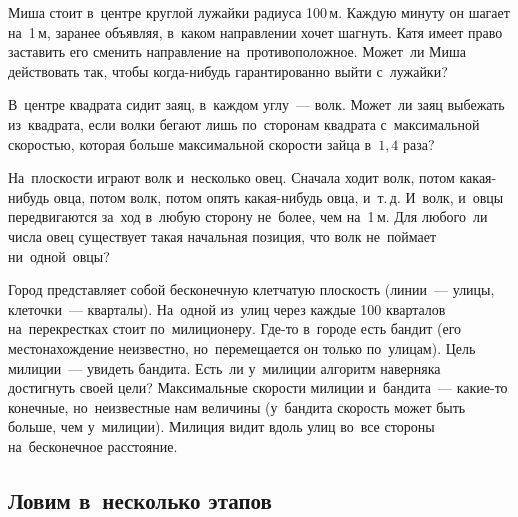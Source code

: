 \begin{problems}

\item
Миша стоит в~центре круглой лужайки радиуса 100\,м.
Каждую минуту он шагает на~1\,м, заранее объявляя, в~каком направлении хочет
шагнуть.
Катя имеет право заставить его сменить направление на~противоположное.
Может~ли Миша действовать так, чтобы когда-нибудь гарантированно выйти
с~лужайки?

\item
В~центре квадрата сидит заяц, в~каждом углу~--- волк.
Может~ли заяц выбежать из~квадрата, если волки бегают лишь по~сторонам квадрата
с~максимальной скоростью, которая больше максимальной скорости зайца
в~$1{,}4$ раза?

\item
На~плоскости играют волк и~несколько овец.
Сначала ходит волк, потом какая-нибудь овца, потом волк, потом опять
какая-нибудь овца, и~т.\,д.
И~волк, и~овцы передвигаются за~ход в~любую сторону не~более, чем на~1\,м.
Для любого~ли числа овец существует такая начальная позиция, что волк
не~поймает ни~одной~овцы?

\item
Город представляет собой бесконечную клетчатую плоскость
(линии~--- улицы, клеточки~--- кварталы).
На~одной из~улиц через каждые 100 кварталов на~перекрестках стоит
по~милиционеру.
Где-то в~городе есть бандит
(его местонахождение неизвестно, но~перемещается он только по~улицам).
Цель милиции~--- увидеть бандита.
Есть~ли у~милиции алгоритм наверняка достигнуть своей цели?
Максимальные скорости милиции и~бандита~--- какие-то конечные, но~неизвестные
нам величины (у~бандита скорость может быть больше, чем у~милиции).
Милиция видит вдоль улиц во~все стороны на~бесконечное расстояние.

\end{problems}

\subsection*{Ловим в~несколько этапов}

